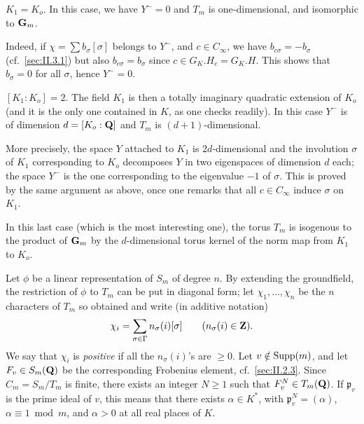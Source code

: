 \begin{nlist}
\item $K_1 = K_o$.  In this case, we have $Y^- = 0$ and $T_m$ is
one-dimensional, and isomorphic to $\mathbf{G}_m$.

Indeed, if $\chi = \sum b_\sigma[\sigma]$ belongs to $Y^-$, and
$c \in C_\infty$, we have $b_{c\sigma} = -b_\sigma$ (cf.~\ref{sec:II.3.1}) but also
$b_{c\sigma} = b_\sigma$ since $c \in G_K.H_c = G_K.H$.  This shows that
$b_\sigma = 0$ for all $\sigma$, hence $Y^- = 0$.

\item $[K_1 : K_o] = 2$.  The field $K_1$ is then a totally imaginary
quadratic extension of $K_o$ (and it is the only one contained in $K$,
as one checks readily).  In this case $Y^-$ is of dimension
$d = [K_o : \mathbf{Q}]$ and $T_m$ is $(d+1)$-dimensional.
\end{nlist}

More precisely, the space $Y$ attached to $K_1$ is $2d$-dimensional and
the involution $\sigma$ of $K_1$ corresponding to $K_o$ decomposes $Y$
in two eigenspaces of dimension $d$ each; the space $Y^-$ is the one
corresponding to the eigenvalue $-1$ of $\sigma$.  This is proved by the
same argument as above, once one remarks that all $c \in C_\infty$
induce $\sigma$ on $K_1$.


In this last case (which is the most interesting one), the torus $T_m$
is isogenous to the product of $\mathbf{G}_m$ by the $d$-dimensional torus kernel
of the norm map from $K_1$ to $K_o$.


Let $\phi$ be a linear representation of $S_m$ of degree $n$.  By
extending the groundfield, the restriction of $\phi$ to $T_m$ can be put
in diagonal form; let $\chi_1, \ldots, \chi_n$ be the $n$ characters of
$T_m$ so obtained and write (in additive notation)
\[
\chi_i = \sum_{\sigma \in \Gamma} n_\sigma(i)[\sigma] \qquad
(n_\sigma(i) \in \mathbf{Z}).
\]
We say that $\chi_i$ is \emph{positive} if all the $n_\sigma(i)$'s are
$\geq 0$.  Let $v \notin \mathrm{Supp}(m)$, and let $F_v \in S_m(\mathbf{Q})$ be the
corresponding Frobenius element, cf.~\ref{sec:II.2.3}.  Since $C_m = S_m/T_m$ is
finite, there exists an integer $N \geq 1$ such that
$F_v^N \in T_m(\mathbf{Q})$.  If $\mathfrak{p}_v$ is the prime ideal of $v$,
this means that there exists $\alpha \in K^*$, with
$\mathfrak{p}_v^N = (\alpha)$, $\alpha \equiv 1 \bmod m$, and $\alpha > 0$
at all real places of $K$.

